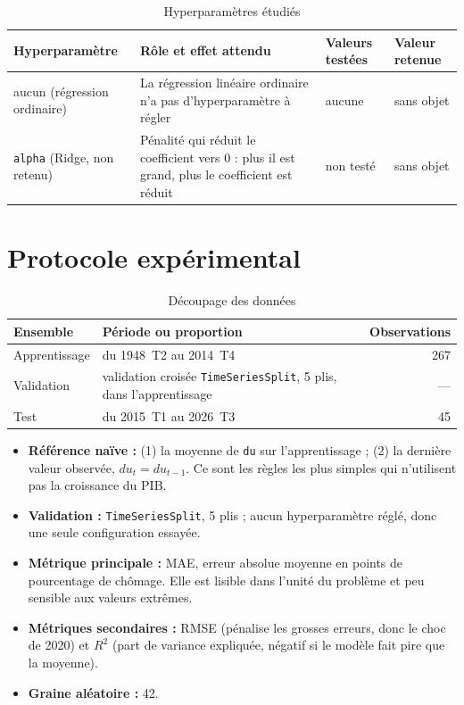 \documentclass[11pt,a4paper]{article}
\begin{document}
\begin{table}[htbp]
  \centering
  \caption{Hyperparamètres étudiés}
  \label{tab:hyper}
  \small
  \begin{tabular}{@{}l P{6.4cm} l l@{}}
    \toprule
    Hyperparamètre & Rôle et effet attendu & Valeurs testées & Valeur retenue \\
    \midrule
    aucun (régression ordinaire) & La régression linéaire ordinaire n'a pas d'hyperparamètre à régler & aucune & sans objet \\
    \texttt{alpha} (Ridge, non retenu) & Pénalité qui réduit le coefficient vers 0 : plus il est grand, plus le coefficient est réduit & non testé & sans objet \\
    \bottomrule
  \end{tabular}
\end{table}

\section{Protocole expérimental}
\label{sec:protocole}
\begin{table}[htbp]
  \centering
  \caption{Découpage des données}
  \label{tab:decoupage}
  \small
  \begin{tabular}{@{}l l r@{}}
    \toprule
    Ensemble & Période ou proportion & Observations \\
    \midrule
    Apprentissage & du 1948~T2 au 2014~T4 & 267 \\
    Validation & validation croisée \texttt{TimeSeriesSplit}, 5 plis, dans l'apprentissage & --- \\
    Test & du 2015~T1 au 2026~T3 & 45 \\
    \bottomrule
  \end{tabular}
\end{table}

\begin{itemize}
  \item \textbf{Référence naïve :} (1) la moyenne de \texttt{du} sur l'apprentissage ; (2) la dernière valeur observée, $du_t = du_{t-1}$. Ce sont les règles les plus simples qui n'utilisent pas la croissance du PIB.
  \item \textbf{Validation :} \texttt{TimeSeriesSplit}, 5 plis ; aucun hyperparamètre réglé, donc une seule configuration essayée.
  \item \textbf{Métrique principale :} MAE, erreur absolue moyenne en points de pourcentage de chômage. Elle est lisible dans l'unité du problème et peu sensible aux valeurs extrêmes.
  \item \textbf{Métriques secondaires :} RMSE (pénalise les grosses erreurs, donc le choc de 2020) et $R^2$ (part de variance expliquée, négatif si le modèle fait pire que la moyenne).
  \item \textbf{Graine aléatoire :} 42.
\end{itemize}
\end{document}
